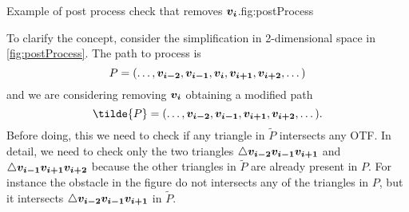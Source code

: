\documentclass[dissertation.tex]{subfiles}
\begin{document}
\begin{myfig}{Example of post process check that removes $\boldsymbol{v_i}$.}{fig:postProcess}
\end{myfig}
To clarify the concept, consider the
simplification in 2-dimensional space in \cref{fig:postProcess}. The
path to process 
is
\begin{equation*}
  P=(\dots,\boldsymbol{v_{i-2}},\boldsymbol{v_{i-1}},\boldsymbol{v_{i}},\boldsymbol{v_{i+1}},\boldsymbol{v_{i+2}},\dots)
\end{equation*}
and we are
considering removing $\boldsymbol{v_i}$ obtaining a modified path
\begin{equation*}
  \tilde{P}=(\dots,\ve{v_{i-2}},\ve{v_{i-1}},\ve{v_{i+1}},\ve{v_{i+2}},\dots).
\end{equation*}
Before doing, this we need to check if any triangle in $\tilde{P}$
intersects any \ac{OTF}. In detail, we need to check only the two
triangles $\triangle\boldsymbol{v_{i-2}}\boldsymbol{v_{i-1}}\boldsymbol{v_{i+1}}$ and
$\triangle\boldsymbol{v_{i-1}}\boldsymbol{v_{i+1}}\boldsymbol{v_{i+2}}$ because the other
triangles in $\tilde{P}$ are already present in $P$. For instance
the obstacle in the figure do not intersects any of the triangles in
$P$, but it intersects $\triangle\boldsymbol{v_{i-2}}\boldsymbol{v_{i-1}}\boldsymbol{v_{i+1}}$ in
$\tilde{P}$.
\end{document}
